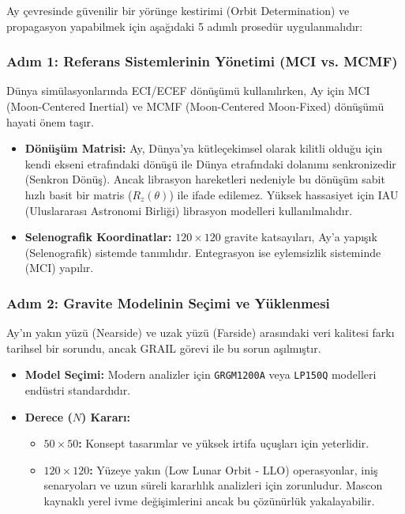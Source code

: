 Ay çevresinde güvenilir bir yörünge kestirimi (Orbit Determination) ve propagasyon yapabilmek için aşağıdaki 5 adımlı prosedür uygulanmalıdır:

\subsubsection{Adım 1: Referans Sistemlerinin Yönetimi (MCI vs. MCMF)}
Dünya simülasyonlarında ECI/ECEF dönüşümü kullanılırken, Ay için MCI (Moon-Centered Inertial) ve MCMF (Moon-Centered Moon-Fixed) dönüşümü hayati önem taşır.
\begin{itemize}
    \item \textbf{Dönüşüm Matrisi:} Ay, Dünya'ya kütleçekimsel olarak kilitli olduğu için kendi ekseni etrafındaki dönüşü ile Dünya etrafındaki dolanımı senkronizedir (Senkron Dönüş). Ancak librasyon hareketleri nedeniyle bu dönüşüm sabit hızlı basit bir matris ($R_z(\theta)$) ile ifade edilemez. Yüksek hassasiyet için IAU (Uluslararası Astronomi Birliği) librasyon modelleri kullanılmalıdır.
    \item \textbf{Selenografik Koordinatlar:} $120 \times 120$ gravite katsayıları, Ay'a yapışık (Selenografik) sistemde tanımlıdır. Entegrasyon ise eylemsizlik sisteminde (MCI) yapılır.
\end{itemize}

\subsubsection{Adım 2: Gravite Modelinin Seçimi ve Yüklenmesi}
Ay'ın yakın yüzü (Nearside) ve uzak yüzü (Farside) arasındaki veri kalitesi farkı tarihsel bir sorundu, ancak GRAIL görevi ile bu sorun aşılmıştır.
\begin{itemize}
    \item \textbf{Model Seçimi:} Modern analizler için \texttt{GRGM1200A} veya \texttt{LP150Q} modelleri endüstri standardıdır.
    \item \textbf{Derece ($N$) Kararı:}
    \begin{itemize}
        \item \textbf{$50 \times 50$:} Konsept tasarımlar ve yüksek irtifa uçuşları için yeterlidir.
        \item \textbf{$120 \times 120$:} Yüzeye yakın (Low Lunar Orbit - LLO) operasyonlar, iniş senaryoları ve uzun süreli kararlılık analizleri için zorunludur. Mascon kaynaklı yerel ivme değişimlerini ancak bu çözünürlük yakalayabilir.
    \end{itemize}
\end{itemize}

